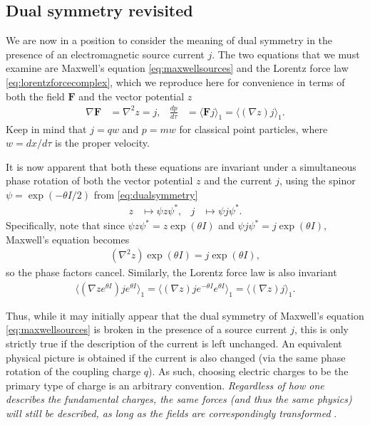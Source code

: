 \documentclass[1p,sort&compress]{elsarticle}
\numberwithin{equation}{section}
\newcommand{\bv}[1]{\mathbf{#1}}
\newcommand{\mean}[1]{\langle #1 \rangle}
\begin{document}

\subsection{Dual symmetry revisited}\label{sec:dualsymmetrysource}


We are now in a position to consider the meaning of dual symmetry in the presence of an electromagnetic source current $j$.  The two equations that we must examine are Maxwell's equation \eqref{eq:maxwellsources} and the Lorentz force law \eqref{eq:lorentzforcecomplex}, which we reproduce here for convenience in terms of both the field $\bv{F}$ and the vector potential $z$
\begin{align}
  \nabla\bv{F} &= \nabla^2 z = j, & \frac{dp}{d\tau} &= \mean{\bv{F}j}_1 = \mean{(\nabla z) j}_1.
\end{align}
Keep in mind that $j = qw$ and $p = mw$ for classical point particles, where $w = dx/d\tau$ is the proper velocity. 

It is now apparent that both these equations are invariant under a simultaneous phase rotation of both the vector potential $z$ and the current $j$, using the spinor $\psi = \exp(-\theta I / 2)$ from \eqref{eq:dualsymmetry}
\begin{align}
  z &\mapsto \psi z\psi^*, & j &\mapsto \psi j \psi^*.
\end{align}
Specifically, note that since $\psi z \psi^* = z\exp(\theta I)$ and $\psi j \psi^* = j \exp(\theta I)$, Maxwell's equation becomes
\begin{align}
  (\nabla^2 z)\exp(\theta I) = j\exp(\theta I),
\end{align}
so the phase factors cancel.  Similarly, the Lorentz force law is also invariant
\begin{align}
  \mean{(\nabla ze^{\theta I}) je^{\theta I}}_1 = \mean{(\nabla z)je^{-\theta I}e^{\theta I}}_1 = \mean{(\nabla z) j}_1.
\end{align}

Thus, while it may initially appear that the dual symmetry of Maxwell's equation \eqref{eq:maxwellsources} is broken in the presence of a source current $j$, this is only strictly true if the description of the current is left unchanged.  An equivalent physical picture is obtained if the current is also changed (via the same phase rotation of the coupling charge $q$).  As such, choosing electric charges to be the primary type of charge is an arbitrary convention. \emph{Regardless of how one describes the fundamental charges, the same forces (and thus the same physics) will still be described, as long as the fields are correspondingly transformed} \cite{Shnir2005}.
\end{document}
